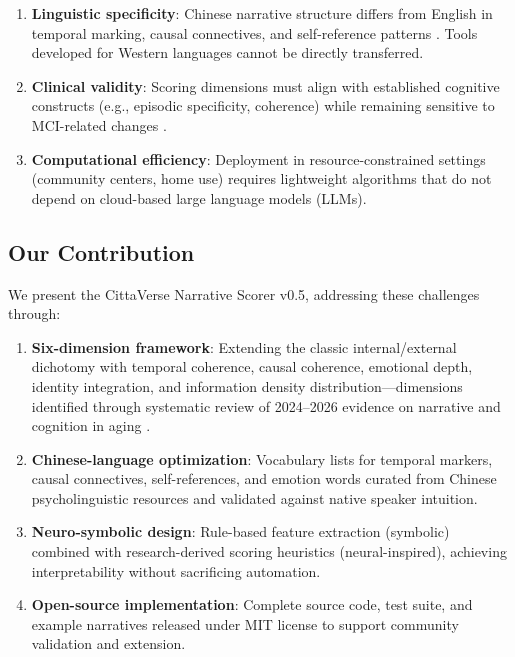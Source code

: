 \documentclass[11pt]{article}
\begin{document}
\begin{enumerate}[label=(\arabic*)]
    \item \textbf{Linguistic specificity}: Chinese narrative structure differs from English in temporal marking, causal connectives, and self-reference patterns \citep{chen2021}. Tools developed for Western languages cannot be directly transferred.
    \item \textbf{Clinical validity}: Scoring dimensions must align with established cognitive constructs (e.g., episodic specificity, coherence) while remaining sensitive to MCI-related changes \citep{murphy2023}.
    \item \textbf{Computational efficiency}: Deployment in resource-constrained settings (community centers, home use) requires lightweight algorithms that do not depend on cloud-based large language models (LLMs).
\end{enumerate}

\subsection{Our Contribution}

We present the CittaVerse Narrative Scorer v0.5, addressing these challenges through:

\begin{enumerate}[label=(\arabic*)]
    \item \textbf{Six-dimension framework}: Extending the classic internal/external dichotomy \citep{levine2002} with temporal coherence, causal coherence, emotional depth, identity integration, and information density distribution---dimensions identified through systematic review of 2024--2026 evidence on narrative and cognition in aging \citep{shankar2025, yang2026, kensinger2026}.
    \item \textbf{Chinese-language optimization}: Vocabulary lists for temporal markers, causal connectives, self-references, and emotion words curated from Chinese psycholinguistic resources and validated against native speaker intuition.
    \item \textbf{Neuro-symbolic design}: Rule-based feature extraction (symbolic) combined with research-derived scoring heuristics (neural-inspired), achieving interpretability without sacrificing automation.
    \item \textbf{Open-source implementation}: Complete source code, test suite, and example narratives released under MIT license to support community validation and extension.
\end{enumerate}
\end{document}
